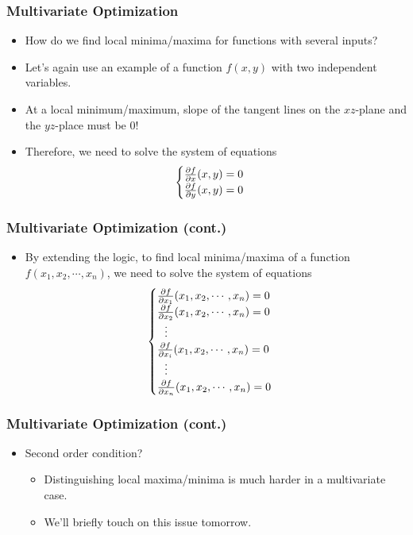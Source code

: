 \documentclass[pdflatex, 12pt]{beamer}
\begin{document}
\begin{frame}
\frametitle{Multivariate Optimization}
\begin{itemize}
\item How do we find local minima/maxima for functions with several inputs?
\vspace{0.4cm}
\item Let's again use an example of a function $f(x, y)$ with two independent variables.
\vspace{0.4cm}
\item At a local minimum/maximum, slope of the tangent lines on the $xz$-plane and the $yz$-place must be 0! 
\vspace{0.4cm}
\item Therefore, we need to solve the system of equations
 \begin{eqnarray}
 \begin{cases}
 \frac{\partial f}{\partial x} (x, y) = 0 \\
 \frac{\partial f}{\partial y} (x, y) = 0 \notag
 \end{cases}
 \end{eqnarray} 
\end{itemize}
\end{frame}

\begin{frame}
\frametitle{Multivariate Optimization (cont.)}
\begin{itemize}
\item By extending the logic, to find local minima/maxima of a function $f(x_1, x_2, \cdots, x_n)$, we need to solve the system of equations
 {\normalsize
 \begin{eqnarray}
 \begin{cases}
 \frac{\partial f}{\partial x_1} (x_1, x_2, \cdots, x_n) = 0 \\
 \frac{\partial f}{\partial x_2} (x_1, x_2, \cdots, x_n) = 0 \\
 \ \ \vdots \\
 \frac{\partial f}{\partial x_i} (x_1, x_2, \cdots, x_n) = 0 \\
 \ \ \vdots \\
 \frac{\partial f}{\partial x_n} (x_1, x_2, \cdots, x_n) = 0 \notag
 \end{cases}
 \end{eqnarray}
 }
\end{itemize}
\end{frame}

\begin{frame}
\frametitle{Multivariate Optimization (cont.)}
\begin{itemize}
\item Second order condition?
 \begin{itemize}
 \item Distinguishing local maxima/minima is much harder in a multivariate case.
 \item We'll briefly touch on this issue tomorrow.
 \end{itemize}
\end{itemize}
\end{frame}
\end{document}
